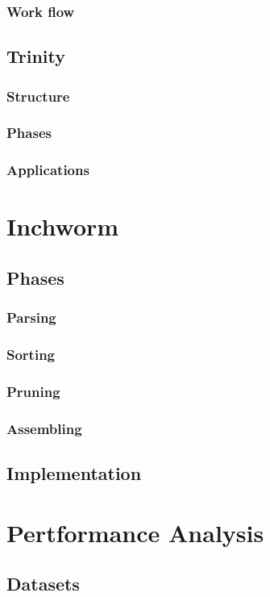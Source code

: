 \documentclass[plainarticle,zihtitle,english,final,hyperref,utf8]{zihpub}
\begin{document}
\subsubsection{Work flow}
\subsection{Trinity}
\subsubsection{Structure}
\subsubsection{Phases}
\subsubsection{Applications}

\section{Inchworm}
\subsection{Phases}
\subsubsection{Parsing}
\subsubsection{Sorting}
\subsubsection{Pruning}
\subsubsection{Assembling}
\subsection{Implementation}

\section{Pertformance Analysis}
\subsection{Datasets}
\end{document}
